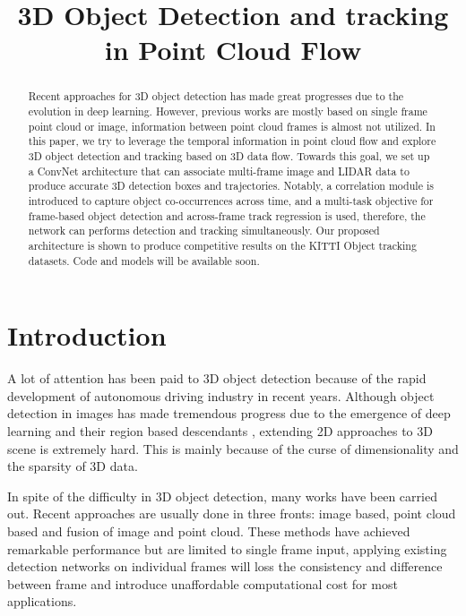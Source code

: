 \documentclass{bmvc2k}
\title{3D Object Detection and tracking in Point Cloud Flow}
\begin{document}
\maketitle

\begin{abstract}
Recent approaches for 3D object detection has made great progresses due to the evolution in deep learning. However, previous works are mostly based on single frame point cloud or image, information between point cloud frames is almost not utilized. In this paper, we try to leverage the temporal information in point cloud flow and explore 3D object detection and tracking based on 3D data flow. Towards this goal, we set up a ConvNet architecture that can associate multi-frame image and LIDAR data to produce accurate 3D detection boxes and trajectories. Notably, a correlation module is introduced to capture object co-occurrences across time, and a multi-task objective for frame-based object detection and across-frame track regression is used, therefore, the network can performs detection and tracking simultaneously. Our proposed architecture is shown to produce competitive results on the KITTI Object tracking datasets. Code and models will be available soon.
\end{abstract}

\section{Introduction}
\label{sec:intro}
A lot of attention has been paid to 3D object detection because of the rapid development of  autonomous driving industry in recent years. Although object detection in images has made tremendous progress due to the emergence of deep learning \cite{krizhevsky2012imagenet, simonyan2014very, he2016deep} and their region based descendants \cite{dai2016r, girshick2015fast, ren2015faster}, extending 2D approaches to 3D scene is extremely hard. This is mainly because of the curse of dimensionality and the sparsity of 3D data. 

In spite of the difficulty in 3D object detection, many works have been carried out. Recent approaches are usually done in three fronts: image based, point cloud based and fusion of image and point cloud. These methods have achieved remarkable performance but are limited to single frame input, applying existing detection networks on individual frames will loss the consistency and difference between frame and introduce unaffordable computational cost for most applications.
\end{document}
